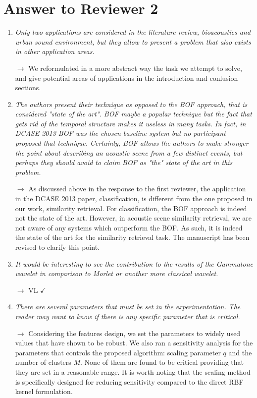 \documentclass[10pt]{article}
\begin{document}
\section{Answer to Reviewer 2}

\begin{enumerate}

\item \emph{Only two applications are considered in the literature review, bioacoustics and urban sound environment, but they allow to present a problem that also exists in other application areas.}

$\rightarrow$ We reformulated in a more abstract way the task we attempt to solve, and give potential areas of applications in the introduction and conlusion sections.

\item \emph{The authors present their technique as opposed to the BOF approach, that is considered "state of the art". BOF maybe a popular technique but the fact that gets rid of the temporal structure makes it useless in many tasks. In fact, in DCASE 2013 BOF was the chosen baseline system but no participant proposed that technique. Certainly, BOF allows the authors to make stronger the point about describing an acoustic scene from a few distinct events, but perhaps they should avoid to claim BOF as "the" state of the art in this problem.}

$\rightarrow$
As discussed above in the response to the first reviewer, the application in the DCASE 2013 paper, classification, is different from the one proposed in our work, similarity retrieval. For classification, the BOF approach is indeed not the state of the art. However, in acoustic scene similarity retrieval, we are not aware of any systems which outperform the BOF. As such, it is indeed the state of the art for the similarity retrieval task. The manuscript has been revised to clarify this point.

\item \emph{It would be interesting to see the contribution to the results of the Gammatone wavelet in comparison to Morlet or another more classical wavelet.}

$\rightarrow$ VL $\checkmark$

\item \emph{There are several parameters that must be set in the experimentation. The reader may want to know if there is any specific parameter that is critical.}

$\rightarrow$ Considering the features design, we set the parameters to widely used values that have shown to be robust. We also ran a sensitivity analysis for the parameters that controls the proposed algorithm: scaling parameter $q$ and the number of clusters $M$. None of them are found to be critical providing that they are set in a reasonable range. It is worth noting that the scaling method is specifically designed for reducing sensitivity compared to the direct RBF kernel formulation.


\end{enumerate}
\end{document}
